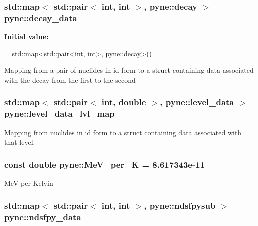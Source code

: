 \hypertarget{namespacepyne_ac880c3701eca3453cb9cdfab30195d65}{
\subsubsection[{decay\+\_\+data}]{\setlength{\rightskip}{0pt plus 5cm}std\+::map$<$ std\+::pair$<$ int, int $>$, {\bf pyne\+::decay} $>$ pyne\+::decay\+\_\+data}}\label{namespacepyne_ac880c3701eca3453cb9cdfab30195d65}
{\bfseries Initial value\+:}
\begin{DoxyCode}
= 
  std::map<std::pair<int, int>, \hyperlink{structpyne_1_1decay}{pyne::decay}>()
\end{DoxyCode}
Mapping from a pair of nuclides in id form to a struct containing data associated with the decay from the first to the second \hypertarget{namespacepyne_aa5b6136e3970959756640b867754bb62}{
\subsubsection[{level\+\_\+data\+\_\+lvl\+\_\+map}]{\setlength{\rightskip}{0pt plus 5cm}std\+::map$<$ std\+::pair$<$ int, double $>$, {\bf pyne\+::level\+\_\+data} $>$ pyne\+::level\+\_\+data\+\_\+lvl\+\_\+map}}\label{namespacepyne_aa5b6136e3970959756640b867754bb62}
Mapping from nuclides in id form to a struct containing data associated with that level. \hypertarget{namespacepyne_af4fb3aac22e7bda0ece3bcf515151611}{
\subsubsection[{Me\+V\+\_\+per\+\_\+\+K}]{\setlength{\rightskip}{0pt plus 5cm}const double pyne\+::\+Me\+V\+\_\+per\+\_\+\+K = 8.\+617343e-\/11}}\label{namespacepyne_af4fb3aac22e7bda0ece3bcf515151611}
Me\+V per Kelvin \hypertarget{namespacepyne_a0526a4bf1637612d760c106836475c6d}{
\subsubsection[{ndsfpy\+\_\+data}]{\setlength{\rightskip}{0pt plus 5cm}std\+::map$<$ std\+::pair$<$ int, int $>$, {\bf pyne\+::ndsfpysub} $>$ pyne\+::ndsfpy\+\_\+data}}\label{namespacepyne_a0526a4bf1637612d760c106836475c6d}
